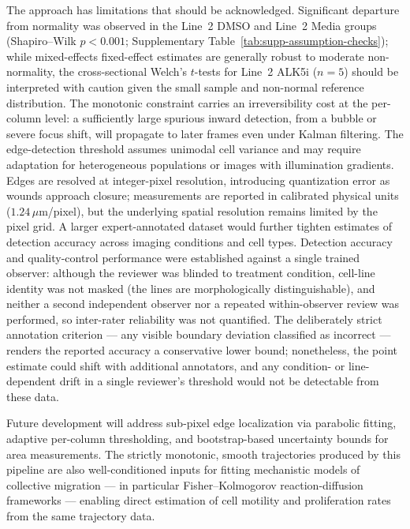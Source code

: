 The approach has limitations that should be acknowledged. Significant departure from normality was observed in the Line~2 DMSO and Line~2 Media groups (Shapiro--Wilk $p < 0.001$; Supplementary Table~\ref{tab:supp-assumption-checks}); while mixed-effects fixed-effect estimates are generally robust to moderate non-normality, the cross-sectional Welch's $t$-tests for Line~2 ALK5i ($n = 5$) should be interpreted with caution given the small sample and non-normal reference distribution. The monotonic constraint carries an irreversibility cost at the per-column level: a sufficiently large spurious inward detection, from a bubble or severe focus shift, will propagate to later frames even under Kalman filtering. The edge-detection threshold assumes unimodal cell variance and may require adaptation for heterogeneous populations or images with illumination gradients. Edges are resolved at integer-pixel resolution, introducing quantization error as wounds approach closure; measurements are reported in calibrated physical units ($1.24\,\mu$m/pixel), but the underlying spatial resolution remains limited by the pixel grid. A larger expert-annotated dataset would further tighten estimates of detection accuracy across imaging conditions and cell types. Detection accuracy and quality-control performance were established against a single trained observer: although the reviewer was blinded to treatment condition, cell-line identity was not masked (the lines are morphologically distinguishable), and neither a second independent observer nor a repeated within-observer review was performed, so inter-rater reliability was not quantified. The deliberately strict annotation criterion --- any visible boundary deviation classified as incorrect --- renders the reported accuracy a conservative lower bound; nonetheless, the point estimate could shift with additional annotators, and any condition- or line-dependent drift in a single reviewer's threshold would not be detectable from these data.

Future development will address sub-pixel edge localization via parabolic fitting, adaptive per-column thresholding, and bootstrap-based uncertainty bounds for area measurements. The strictly monotonic, smooth trajectories produced by this pipeline are also well-conditioned inputs for fitting mechanistic models of collective migration — in particular Fisher--Kolmogorov reaction-diffusion frameworks \citep{Jin2015,Maini2020,Simpson2013} — enabling direct estimation of cell motility and proliferation rates from the same trajectory data.

